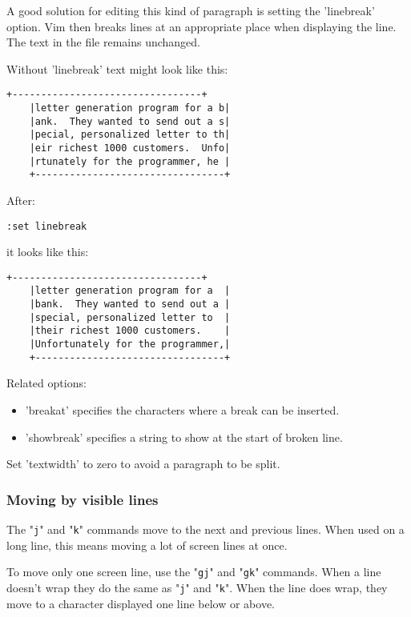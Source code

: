 A good solution for editing this kind of paragraph is setting the 'linebreak' option.
Vim then breaks lines at an appropriate place when displaying the line.
The text in the file remains unchanged.

Without 'linebreak' text might look like this:

\begin{Verbatim}[samepage=true]
    +---------------------------------+
    |letter generation program for a b|
    |ank.  They wanted to send out a s|
    |pecial, personalized letter to th|
    |eir richest 1000 customers.  Unfo|
    |rtunately for the programmer, he |
    +---------------------------------+
\end{Verbatim}

After:

\begin{Verbatim}[samepage=true]
 :set linebreak
\end{Verbatim}

it looks like this:

\begin{Verbatim}[samepage=true]
    +---------------------------------+
    |letter generation program for a  |
    |bank.  They wanted to send out a |
    |special, personalized letter to  |
    |their richest 1000 customers.    |
    |Unfortunately for the programmer,|
    +---------------------------------+
\end{Verbatim}

Related options:
\begin{itemize}
				\item 'breakat' specifies the characters where a break can be inserted.
				\item 'showbreak' specifies a string to show at the start of broken line.
\end{itemize}
Set 'textwidth' to zero to avoid a paragraph to be split.
\subsubsection{Moving by visible lines}
The "\verb!j!" and "\verb!k!" commands move to the next and previous lines.
When used on a long line, this means moving a lot of screen lines at once.

To move only one screen line, use the "\verb!gj!" and "\verb!gk!" commands.
When a line doesn't wrap they do the same as "\verb!j!" and "\verb!k!".
When the line does wrap, they move to a character displayed one line below or above.

